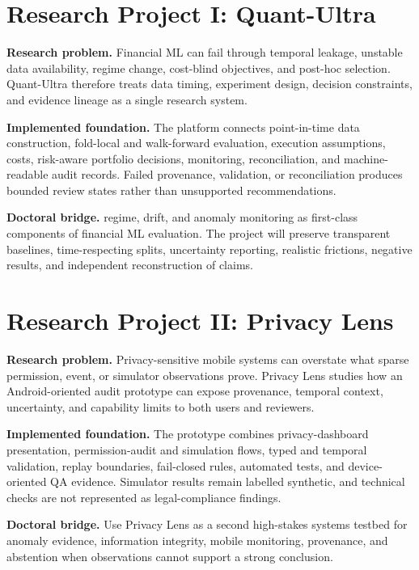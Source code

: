 \documentclass[11pt]{article}
\begin{document}
\section*{Research Project I: Quant-Ultra}
\textbf{Research problem.} Financial ML can fail through temporal leakage, unstable data availability, regime change, cost-blind objectives, and post-hoc selection. Quant-Ultra therefore treats data timing, experiment design, decision constraints, and evidence lineage as a single research system.

\textbf{Implemented foundation.} The platform connects point-in-time data construction, fold-local and walk-forward evaluation, execution assumptions, costs, risk-aware portfolio decisions, monitoring, reconciliation, and machine-readable audit records. Failed provenance, validation, or reconciliation produces bounded review states rather than unsupported recommendations.

\textbf{Doctoral bridge.} regime, drift, and anomaly monitoring as first-class components of financial ML evaluation. The project will preserve transparent baselines, time-respecting splits, uncertainty reporting, realistic frictions, negative results, and independent reconstruction of claims.

\section*{Research Project II: Privacy Lens}
\textbf{Research problem.} Privacy-sensitive mobile systems can overstate what sparse permission, event, or simulator observations prove. Privacy Lens studies how an Android-oriented audit prototype can expose provenance, temporal context, uncertainty, and capability limits to both users and reviewers.

\textbf{Implemented foundation.} The prototype combines privacy-dashboard presentation, permission-audit and simulation flows, typed and temporal validation, replay boundaries, fail-closed rules, automated tests, and device-oriented QA evidence. Simulator results remain labelled synthetic, and technical checks are not represented as legal-compliance findings.

\textbf{Doctoral bridge.} Use Privacy Lens as a second high-stakes systems testbed for anomaly evidence, information integrity, mobile monitoring, provenance, and abstention when observations cannot support a strong conclusion.
\end{document}
